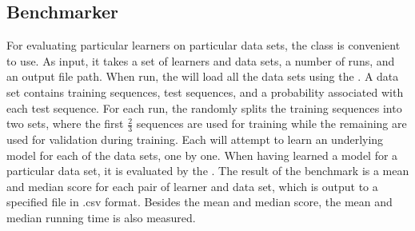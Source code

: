 \subsection{Benchmarker}
For evaluating particular learners on particular data sets, the  class is convenient to use.
As input, it takes a set of learners and data sets, a number of runs, and an output file path.
When run, the  will load all the data sets using the . A data set contains training sequences, test sequences, and a probability associated with each test sequence. For each run, the  randomly splits the training sequences into two sets, where the first $\frac{2}{3}$ sequences are used for training while the remaining are used for validation during training.
Each  will attempt to learn an underlying model for each of the data sets, one by one. When having learned a model for a particular data set, it is evaluated by the . The result of the benchmark is a mean and median score for each pair of learner and data set, which is output to a specified file in .csv format. Besides the mean and median score, the mean and median running time is also measured.
